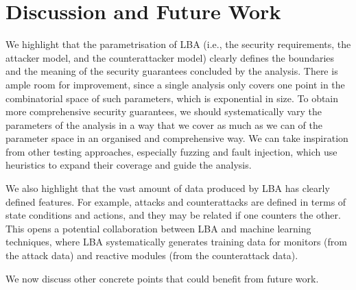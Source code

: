 {{\section{Discussion and Future Work}
\label{sec:CPSRobustness:Discussion}
We highlight that the parametrisation of LBA (i.e., the security requirements, the attacker model, and the counterattacker model) clearly defines the boundaries and the meaning of the security guarantees concluded by the analysis. There is ample room for improvement, since a single analysis only covers one point in the combinatorial space of such parameters, which is exponential in size. To obtain more comprehensive security guarantees, we should systematically vary the parameters of the analysis in a way that we cover as much as we can of the parameter space in an organised and comprehensive way. We can take inspiration from other testing approaches, especially fuzzing and fault injection, which use heuristics to expand their coverage and guide the analysis. 

We also highlight that the vast amount of data produced by LBA has clearly defined features. For example, attacks and counterattacks are defined in terms of state conditions and actions, and they may be related if one counters the other. This opens a potential collaboration between LBA and machine learning techniques, where LBA systematically generates training data for monitors (from the attack data) and reactive modules (from the counterattack data).

We now discuss other concrete points that could benefit from future work.
}}
